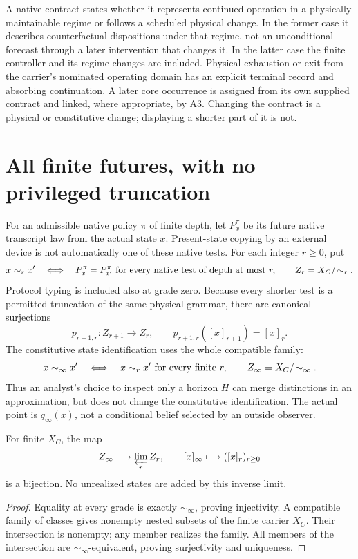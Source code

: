 A native contract states whether it represents continued operation in a physically maintainable regime or follows a scheduled physical change. In the former case it describes counterfactual dispositions under that regime, not an unconditional forecast through a later intervention that changes it. In the latter case the finite controller and its regime changes are included. Physical exhaustion or exit from the carrier's nominated operating domain has an explicit terminal record and absorbing continuation. A later core occurrence is assigned from its own supplied contract and linked, where appropriate, by A3. Changing the contract is a physical or constitutive change; displaying a shorter part of it is not.

\section{All finite futures, with no privileged truncation}
\label{sec:spc2-projective-profile}
For an admissible native policy $\pi$ of finite depth, let
$P_x^\pi$ be its future native transcript law from the actual state
$x$. Present-state copying by an external device is not automatically
one of these native tests. For each integer $r\geq0$, put
\[
 x\sim_r x'\quad\Longleftrightarrow\quad
 P_x^\pi=P_{x'}^\pi\ \hbox{for every native test of depth at most }r,
 \qquad Z_r=X_C/\!\sim_r.
\]
Protocol typing is included also at grade zero. Because every
shorter test is a permitted truncation of the same physical grammar,
there are canonical surjections
\[
 p_{r+1,r}:Z_{r+1}\longrightarrow Z_r,
 \qquad p_{r+1,r}([x]_{r+1})=[x]_r.
\]
The constitutive state identification uses the whole compatible
family:
\[
 x\sim_\infty x'\quad\Longleftrightarrow\quad
 x\sim_r x'\ \hbox{for every finite }r,
 \qquad Z_\infty=X_C/\!\sim_\infty.
\]
Thus an analyst's choice to inspect only a horizon $H$ can merge
distinctions in an approximation, but does not change the constitutive
identification. The actual point is $q_\infty(x)$, not a conditional
belief selected by an outside observer.

\begin{proposition}
\label{prop:spc2-projective}
For finite $X_C$, the map
\[
 Z_\infty\longrightarrow\varprojlim_r Z_r,
 \qquad [x]_\infty\longmapsto([x]_r)_{r\geq0}
\]
is a bijection. No unrealized states are added by this inverse limit.
\end{proposition}
\begin{proof}
Equality at every grade is exactly $\sim_\infty$, proving
injectivity. A compatible family of classes gives nonempty nested
subsets of the finite carrier $X_C$. Their intersection is nonempty;
any member realizes the family. All members of the intersection are
$\sim_\infty$-equivalent, proving surjectivity and uniqueness.
\end{proof}

